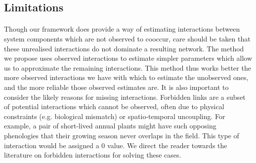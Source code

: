\documentclass[a4,12pt]{article}
\begin{document}
\begin{itemize}

   \subsection{Limitations}
        
        \paragraph{}
        Though our framework does provide a way of estimating interactions between system components which are not observed to cooccur, care should be taken that these unrealised interactions do not dominate a resulting network. The method we propose uses observed interactions to estimate simpler parameters which allow us to approximate the remaining interactions. This method thus works better the more observed interactions we have with which to estimate the unobserved ones, and the more reliable those observed estimates are. It is also important to consider the likely reasons for missing interactions. Forbidden links are a subset of potential interactions which cannot be observed, often due to physical constraints (e.g. biological mismatch) or spatio-temporal uncoupling. For example, a pair of short-lived annual plants might have such opposing phenologies that their growing season never overlaps in the field. This type of interaction would be assigned a 0 value. We direct the reader towards the literature on forbidden interactions \parencite{Olesen2011, Jordano2016} for solving these cases. 


\end{itemize}
\end{document}
